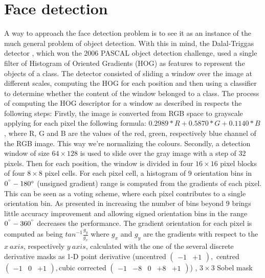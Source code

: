 \section{Face detection}
A way to approach the face detection problem is to see it as an instance of the much general problem of object detection. With this in mind, the Dalal-Triggas detector \cite{DalalTriggs05}, which won the 2006 PASCAL object detection challenge, used a single filter of Histogram of Oriented Gradients (HOG) as features to represent the objects of a class. The detector consisted of sliding a window over the image at different scales, computing the HOG for each position and then using a classifier to determine whether the content of the window belonged to a class.
The process of computing the HOG descriptor for a window as described in \cite{DalalTriggs05} respects the following steps: 
Firstly, the image is converted from RGB space to grayscale applying for each pixel the following formula: $0.2989 * R + 0.5870 * G + 0.1140 * B$, where R, G and B are the values of the red, green, respectively blue channel of the RGB image.	This way we're normalizing the colours. 
Secondly, a detection window of size $64\times128$ is used to slide over the gray image with a step of 32 pixels.
Then for each position, the window is divided in four $16\times16$ pixel blocks of four $8\times8$ pixel cells.
For each pixel cell, a histogram of 9 orientation bins in $0^{\degree}-180{\degree}$ (unsigned gradient) range is computed from the gradients of each pixel. This can be seen as a voting scheme, where each pixel contributes to a single orientation bin. As presented in \cite{DalalTriggs05} increasing the number of bins beyond 9 brings little accuracy improvement and allowing signed orientation bins in the range $0^{\degree}-360^{\degree}$ decreases the performance.
The gradient orientation for each pixel is computed as being $tan^{-1}\frac{g_{y}}{g_{x}}$ where $g_{x}$ and $g_{y}$ are the gradients with respect to the $x\ axis$, respectively $y\ axis$, calculated with the one of the several discrete derivative masks as 1-D point derivative (uncentred 
$
(
\begin{smallmatrix}
	-1 & +1
\end{smallmatrix}), 
$
centred 
$(
\begin{smallmatrix}
-1 & 0 & +1
\end{smallmatrix}),
$cubic corrected
$
 ( 
\begin{smallmatrix}
	-1 & -8 & 0 & +8 & +1
\end{smallmatrix})
$)
, $3\times3$ Sobel mask
